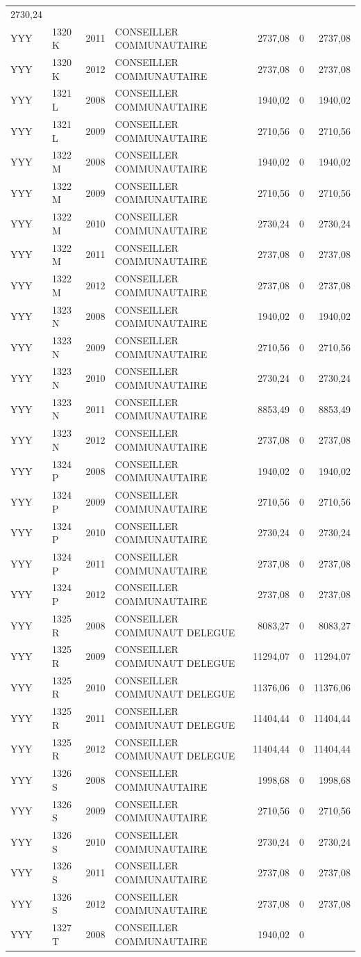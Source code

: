 \begin{longtable}[]{@{}llrlrrr@{}}
2730,24\tabularnewline
YYY & 1320 K & 2011 & CONSEILLER COMMUNAUTAIRE & 2737,08 & 0 &
2737,08\tabularnewline
YYY & 1320 K & 2012 & CONSEILLER COMMUNAUTAIRE & 2737,08 & 0 &
2737,08\tabularnewline
YYY & 1321 L & 2008 & CONSEILLER COMMUNAUTAIRE & 1940,02 & 0 &
1940,02\tabularnewline
YYY & 1321 L & 2009 & CONSEILLER COMMUNAUTAIRE & 2710,56 & 0 &
2710,56\tabularnewline
YYY & 1322 M & 2008 & CONSEILLER COMMUNAUTAIRE & 1940,02 & 0 &
1940,02\tabularnewline
YYY & 1322 M & 2009 & CONSEILLER COMMUNAUTAIRE & 2710,56 & 0 &
2710,56\tabularnewline
YYY & 1322 M & 2010 & CONSEILLER COMMUNAUTAIRE & 2730,24 & 0 &
2730,24\tabularnewline
YYY & 1322 M & 2011 & CONSEILLER COMMUNAUTAIRE & 2737,08 & 0 &
2737,08\tabularnewline
YYY & 1322 M & 2012 & CONSEILLER COMMUNAUTAIRE & 2737,08 & 0 &
2737,08\tabularnewline
YYY & 1323 N & 2008 & CONSEILLER COMMUNAUTAIRE & 1940,02 & 0 &
1940,02\tabularnewline
YYY & 1323 N & 2009 & CONSEILLER COMMUNAUTAIRE & 2710,56 & 0 &
2710,56\tabularnewline
YYY & 1323 N & 2010 & CONSEILLER COMMUNAUTAIRE & 2730,24 & 0 &
2730,24\tabularnewline
YYY & 1323 N & 2011 & CONSEILLER COMMUNAUTAIRE & 8853,49 & 0 &
8853,49\tabularnewline
YYY & 1323 N & 2012 & CONSEILLER COMMUNAUTAIRE & 2737,08 & 0 &
2737,08\tabularnewline
YYY & 1324 P & 2008 & CONSEILLER COMMUNAUTAIRE & 1940,02 & 0 &
1940,02\tabularnewline
YYY & 1324 P & 2009 & CONSEILLER COMMUNAUTAIRE & 2710,56 & 0 &
2710,56\tabularnewline
YYY & 1324 P & 2010 & CONSEILLER COMMUNAUTAIRE & 2730,24 & 0 &
2730,24\tabularnewline
YYY & 1324 P & 2011 & CONSEILLER COMMUNAUTAIRE & 2737,08 & 0 &
2737,08\tabularnewline
YYY & 1324 P & 2012 & CONSEILLER COMMUNAUTAIRE & 2737,08 & 0 &
2737,08\tabularnewline
YYY & 1325 R & 2008 & CONSEILLER COMMUNAUT DELEGUE & 8083,27 & 0 &
8083,27\tabularnewline
YYY & 1325 R & 2009 & CONSEILLER COMMUNAUT DELEGUE & 11294,07 & 0 &
11294,07\tabularnewline
YYY & 1325 R & 2010 & CONSEILLER COMMUNAUT DELEGUE & 11376,06 & 0 &
11376,06\tabularnewline
YYY & 1325 R & 2011 & CONSEILLER COMMUNAUT DELEGUE & 11404,44 & 0 &
11404,44\tabularnewline
YYY & 1325 R & 2012 & CONSEILLER COMMUNAUT DELEGUE & 11404,44 & 0 &
11404,44\tabularnewline
YYY & 1326 S & 2008 & CONSEILLER COMMUNAUTAIRE & 1998,68 & 0 &
1998,68\tabularnewline
YYY & 1326 S & 2009 & CONSEILLER COMMUNAUTAIRE & 2710,56 & 0 &
2710,56\tabularnewline
YYY & 1326 S & 2010 & CONSEILLER COMMUNAUTAIRE & 2730,24 & 0 &
2730,24\tabularnewline
YYY & 1326 S & 2011 & CONSEILLER COMMUNAUTAIRE & 2737,08 & 0 &
2737,08\tabularnewline
YYY & 1326 S & 2012 & CONSEILLER COMMUNAUTAIRE & 2737,08 & 0 &
2737,08\tabularnewline
YYY & 1327 T & 2008 & CONSEILLER COMMUNAUTAIRE & 1940,02 & 0 &

\end{longtable}
